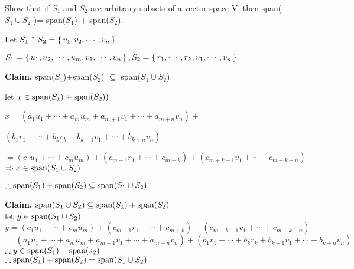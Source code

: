 Show that if $S_1$ and $S_2$ are arbitrary subsets of a vector space $\mathrm{V}$, then span($S_1 \cup S_2$ )= span($S_1$) + span($S_2$).

\begin{tcolorbox}
	\begin{solution}
	
		Let $S_1 \cap S_2 = \left\{ \,v_1,v_2,\cdots , v_n \,\right\}$,
		
		$S_1 = \left\{ \,u_1,u_2,\cdots,u_m,v_1,\cdots,v_n \,\right\} , S_2 = \left\{ \,r_1,\cdots,r_k,v_{1}, \cdots,v_{n} \,\right\}$  
		
		\textbf{Claim.} span($S_1$)+span($S_2$) $\subseteq$ span($S_1 \cup S_2$)
		
		let $x \in \text{span($S_1$)}+\text{span($S_2$)})$
		
		$x = (a_1u_1+ \cdots +a_mu_m+a_{m+1}v_1+\cdots + a_{m+n}v_n) + $
		
		$ (b_1r_1+\cdots+b_kr_k + b_{k+1}v_1 + \cdots + b_{k+n}v_n) $
		
		$=(c_1u_1 + \cdots + c_mu_m)+(c_{m+1}r_1+ \cdots + c_{m+k})+(c_{m+k+1}v_1 + \cdots + c_{m+k+n})$
		$\Rightarrow x \in \text{span($S_1 \cup S_2$)}$
		
		$\therefore \text{span($S_1$)} + \text{span($S_2$)} \subseteq \text{span($S_1 \cup S_2$)} $
		
		\textbf{Claim.} $\text{span($S_1 \cup S_2$)} \subseteq \text{span($S_1$)} + \text{span($S_2$)}$\\
		let $y \in \text{span($S_1 \cup S_2$)}$\\
		$y = (c_1u_1 + \cdots + c_mu_m)+(c_{m+1}r_1+ \cdots + c_{m+k})+(c_{m+k+1}v_1 + \cdots + c_{m+k+n})$\\
		$= (a_1u_1+ \cdots +a_mu_m+a_{m+1}v_1+\cdots + a_{m+n}v_{n}) + (b_1r_1+\cdots + b_kr_k + b_{k+1}v_1 + \cdots + b_{k+n}v_n)$\\
		$\therefore y \in \text{span($S_1$)} + \text{span($s_2$)}$\\
		$\therefore \text{span($S_1$)} + \text{span($S_2$)} = \text{span($S_1 \cup S_2$)}$
		
	\end{solution}
\end{tcolorbox}